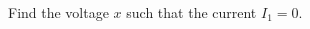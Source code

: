 \begin{multicols}{2}
\begin{ex}
\begin{sol}
\end{sol}
\end{ex}

\begin{ex}
\newline
Find the voltage $x$ such that the current $I_1 = 0$.
\begin{figure}[H]
\centering

\end{figure}
\end{ex}
\end{multicols}
\setlength{\columnsep}{10pt}

